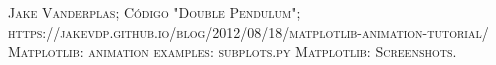 \documentclass[12pt]{article}
\begin{document}
\pagebreak
\begin{thebibliography}{X}
  \textsc{Jake Vanderplas; Código "Double Pendulum"; https://jakevdp.github.io/blog/2012/08/18/matplotlib-animation-tutorial/}
  \textsc{Matplotlib: animation examples: subplots.py}
  \textsc{Matplotlib: Screenshots.}
\end{thebibliography}
\end{document}
